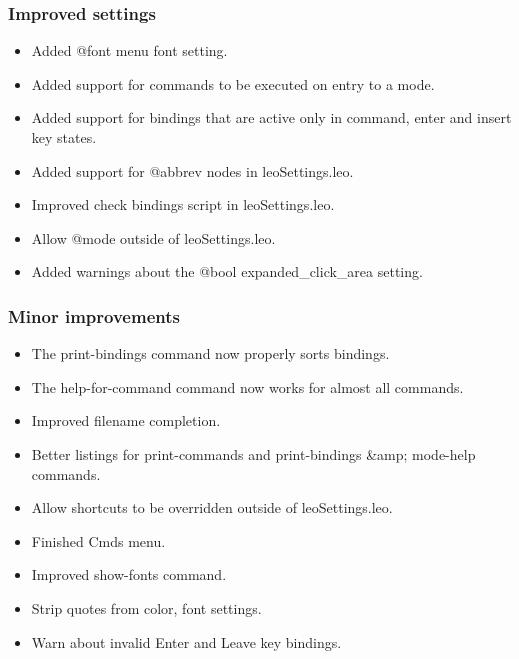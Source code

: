\documentclass[a4paper,10pt,english]{sphinxmanual}
\begin{document}
\subsubsection{Improved settings}
\label{what-is-new:improved-settings}\begin{itemize}
\item {} 
Added @font menu font setting.

\item {} 
Added support for commands to be executed on entry to a mode.

\item {} 
Added support for bindings that are active only in command, enter and insert key states.

\item {} 
Added support for @abbrev nodes in leoSettings.leo.

\item {} 
Improved check bindings script in leoSettings.leo.

\item {} 
Allow @mode outside of leoSettings.leo.

\item {} 
Added warnings about the @bool expanded\_click\_area setting.

\end{itemize}


\subsubsection{Minor improvements}
\label{what-is-new:id26}\begin{itemize}
\item {} 
The print-bindings command now properly sorts bindings.

\item {} 
The help-for-command command now works for almost all commands.

\item {} 
Improved filename completion.

\item {} 
Better listings for print-commands and print-bindings \&amp; mode-help commands.

\item {} 
Allow shortcuts to be overridden outside of leoSettings.leo.

\item {} 
Finished Cmds menu.

\item {} 
Improved show-fonts command.

\item {} 
Strip quotes from color, font settings.

\item {} 
Warn about invalid Enter and Leave key bindings.

\end{itemize}
\end{document}
